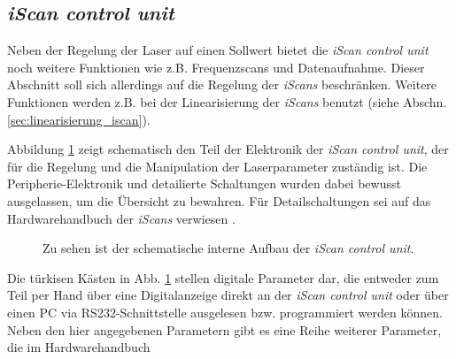 \subsection{\textit{iScan control unit}}\label{subsec:iscan_control_unit}
Neben der Regelung der Laser auf einen Sollwert bietet die \textit{iScan control
unit} noch weitere Funktionen wie z.B. Frequenzscans und Datenaufnahme. Dieser
Abschnitt soll sich allerdings auf die Regelung der \textit{iScans} beschränken.
Weitere Funktionen werden z.B. bei der Linearisierung der \textit{iScans}
benutzt (siehe Abschn.
\ref{sec:linearisierung_iscan}).\par
Abbildung \ref{fig:iscan_control_unit_regelelektronik} zeigt schematisch den
Teil der Elektronik der \textit{iScan control unit}, der für die Regelung und
die Manipulation der Laserparameter zuständig ist. Die Peripherie-Elektronik und
detailierte Schaltungen wurden dabei bewusst ausgelassen, um die Übersicht zu
bewahren. Für Detailschaltungen sei auf das Hardwarehandbuch der \textit{iScans}
verwiesen \cite{iscan_hardware_guide}.\par
\begin{figure}[h]
 	\centering
	\caption[Interner Aufbau der \textit{iScan control unit},
	schematisch]{Zu sehen ist der schematische interne Aufbau der \textit{iScan
	control unit}.}\label{fig:iscan_control_unit_regelelektronik}
\end{figure}
Die türkisen Kästen in Abb. \ref{fig:iscan_control_unit_regelelektronik} stellen
digitale Parameter dar, die entweder zum Teil per Hand über eine Digitalanzeige
direkt an der \textit{iScan control unit} oder über einen PC via
RS232-Schnittstelle ausgelesen bzw. programmiert werden können. Neben den hier angegebenen
Parametern gibt es eine Reihe weiterer Parameter, die im Hardwarehandbuch
